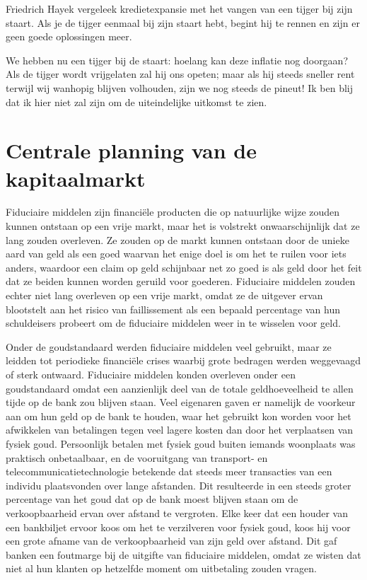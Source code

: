 Friedrich Hayek vergeleek kredietexpansie met het vangen van een tijger bij zijn staart. Als je de tijger eenmaal bij zijn staart hebt, begint hij te rennen en zijn er geen goede oplossingen meer.

\begin{blockquotebox}
We hebben nu een tijger bij de staart: hoelang kan deze inflatie nog doorgaan? Als de tijger wordt vrijgelaten zal hij ons opeten; maar als hij steeds sneller rent terwijl wij wanhopig blijven volhouden, zijn we nog steeds de pineut! Ik ben blij dat ik hier niet zal zijn om de uiteindelijke uitkomst te zien.\footnotemark
\end{blockquotebox}


\section{Centrale planning van de kapitaalmarkt}

Fiduciaire middelen zijn financiële producten die op natuurlijke wijze zouden kunnen ontstaan op een vrije markt, maar het is volstrekt onwaarschijnlijk dat ze lang zouden overleven. Ze zouden op de markt kunnen ontstaan door de unieke aard van geld als een goed waarvan het enige doel is om het te ruilen voor iets anders, waardoor een claim op geld schijnbaar net zo goed is als geld door het feit dat ze beiden kunnen worden geruild voor goederen. Fiduciaire middelen zouden echter niet lang overleven op een vrije markt, omdat ze de uitgever ervan blootstelt aan het risico van faillissement als een bepaald percentage van hun schuldeisers probeert om de fiduciaire middelen weer in te wisselen voor geld.

Onder de goudstandaard werden fiduciaire middelen veel gebruikt, maar ze leidden tot periodieke financiële crises waarbij grote bedragen werden weggevaagd of sterk ontwaard. Fiduciaire middelen konden overleven onder een goudstandaard omdat een aanzienlijk deel van de totale geldhoeveelheid te allen tijde op de bank zou blijven staan. Veel eigenaren gaven er namelijk de voorkeur aan om hun geld op de bank te houden, waar het gebruikt kon worden voor het afwikkelen van betalingen tegen veel lagere kosten dan door het verplaatsen van fysiek goud. Persoonlijk betalen met fysiek goud buiten iemands woonplaats was praktisch onbetaalbaar, en de vooruitgang van transport- en telecommunicatietechnologie betekende dat steeds meer transacties van een individu plaatsvonden over lange afstanden. Dit resulteerde in een steeds groter percentage van het goud dat op de bank moest blijven staan om de verkoopbaarheid ervan over afstand te vergroten. Elke keer dat een houder van een bankbiljet ervoor koos om het te verzilveren voor fysiek goud, koos hij voor een grote afname van de verkoopbaarheid van zijn geld over afstand. Dit gaf banken een foutmarge bij de uitgifte van fiduciaire middelen, omdat ze wisten dat niet al hun klanten op hetzelfde moment om uitbetaling zouden vragen.

